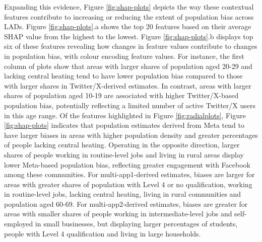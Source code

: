 \documentclass[]{rsos}%
\begin{document}
Expanding this evidence, Figure \ref{fig:shap-plots} depicts the way
these contextual features contribute to increasing or reducing the
extent of population bias across LADs. Figure \ref{fig:shap-plots}.a
shows the top 20 features based on their average SHAP value from the
highest to the lowest. Figure \ref{fig:shap-plots}.b displays top six of
these features revealing how changes in feature values contribute to
changes in population bias, with colour encoding feature values. For
instance, the first column of plots show that areas with larger shares
of population aged 20-29 and lacking central heating tend to have lower
population bias compared to those with larger shares in
Twitter/X-derived estimates. In contrast, areas with larger shares of
population aged 10-19 are associated with higher Twitter/X-based
population bias, potentially reflecting a limited number of active
Twitter/X users in this age range. Of the features highlighted in Figure
\ref{fig:radialplots}, Figure \ref{fig:shap-plots} indicates that
population estimates derived from Meta tend to have larger biases in
areas with higher population density and greater percentages of people
lacking central heating. Operating in the opposite direction, larger
shares of people working in routine-level jobs and living in rural areas
display lower Meta-based population bias, reflecting greater engagement
with Facebook among these communities. For multi-app1-derived estimates,
biases are larger for areas with greater shares of population with Level
4 or no qualification, working in routine-level jobs, lacking central
heating, living in rural communities and population aged 60-69. For
multi-app2-derived estimates, biases are greater for areas with smaller
shares of people working in intermediate-level jobs and self-employed in
small businesses, but displaying larger percentages of students, people
with Level 4 qualification and living in large households.
\end{document}
